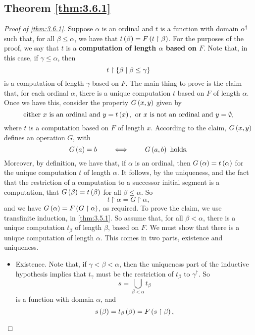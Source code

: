 \pagebreak

\subsection{Theorem \ref{thm:3.6.1}}

\begin{proof}[Proof of \ref{thm:3.6.1}]
Suppose $ \alpha $ is an ordinal and $ t $ is a function with domain $ \alpha^\dagger $ such that, for all $ \beta \le \alpha $, we have that $ t\left( \beta \right) = F\left( t \upharpoonright \beta \right) $. For the purposes of the proof, we say that $ t $ is a \textbf{computation of length $ \alpha $ based on $ F $}. Note that, in this case, if $ \gamma \le \alpha $, then
$$ t \upharpoonright \left\{ \beta \mid \beta \le \gamma \right\} $$
is a computation of length $ \gamma $ based on $ F $. The main thing to prove is the claim that, for each ordinal $ \alpha $, there is a unique computation $ t $ based on $ F $ of length $ \alpha $. Once we have this, consider the property $ G\left( x, y \right) $ given by
$$ \text{either} \ x \ \text{is an ordinal and} \ y = t\left( x \right), \ \text{or} \ x \ \text{is not an ordinal and} \ y = \emptyset, $$
where $ t $ is a computation based on $ F $ of length $ x $. According to the claim, $ G\left( x, y \right) $ defines an operation $ G $, with
$$ G\left( a \right) = b \qquad \iff \qquad G\left( a, b \right) \ \text{holds}. $$
Moreover, by definition, we have that, if $ \alpha $ is an ordinal, then $ G\left( \alpha \right) = t\left( \alpha \right) $ for the unique computation $ t $ of length $ \alpha $. It follows, by the uniqueness, and the fact that the restriction of a computation to a successor initial segment is a computation, that $ G\left( \beta \right) = t\left( \beta \right) $ for all $ \beta \le \alpha $. So
$$ t \upharpoonright \alpha = G \upharpoonright \alpha, $$
and we have $ G\left( \alpha \right) = F\left( G \upharpoonright \alpha \right) $, as required. To prove the claim, we use transfinite induction, in \ref{thm:3.5.1}. So assume that, for all $ \beta < \alpha $, there is a unique computation $ t_\beta $ of length $ \beta $, based on $ F $. We must show that there is a unique computation of length $ \alpha $. This comes in two parts, existence and uniqueness.
\begin{itemize}
\item Existence. Note that, if $ \gamma < \beta < \alpha $, then the uniqueness part of the inductive hypothesis implies that $ t_\gamma $ must be the restriction of $ t_\beta $ to $ \gamma^\dagger $. So
$$ s = \bigcup_{\beta < \alpha} t_\beta $$
is a function with domain $ \alpha $, and
$$ s\left( \beta \right) = t_\beta\left( \beta \right) = F\left( s \upharpoonright \beta \right), $$

\end{itemize}
\end{proof}
